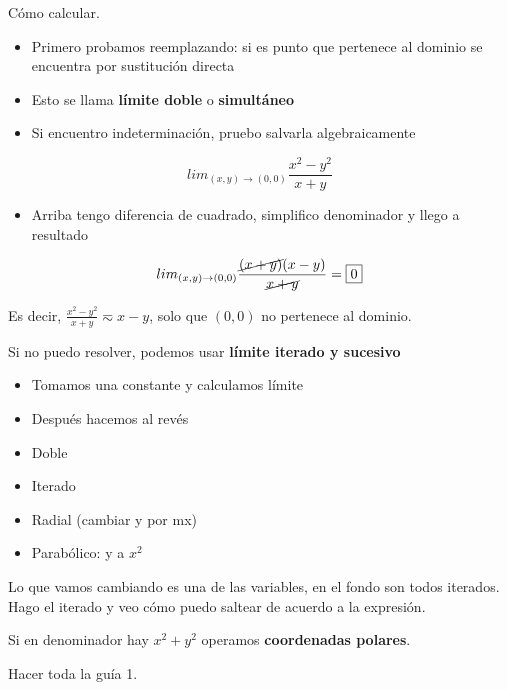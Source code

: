 Cómo calcular.
\begin{itemize}
    \item Primero probamos reemplazando: si es punto que pertenece al dominio
          se encuentra por sustitución directa
    \item Esto se llama \textbf{límite doble} o \textbf{simultáneo}
    \item Si encuentro indeterminación, pruebo salvarla algebraicamente
\end{itemize}

\begin{equation*}
    lim_{(x,y) \to (0,0)} \frac{x^{2} - y^{2}}{x + y}
\end{equation*}

\begin{itemize}
    \item Arriba tengo diferencia de cuadrado, simplifico denominador y
          llego a resultado
\end{itemize}

\begin{equation*}
    lim_{(x,y) \to (0,0)} \frac{\cancel{(x + y)}(x - y)}{\cancel{x + y}} = \boxed{0}
\end{equation*}

Es decir, \(\frac{x^{2} - y^{2}}{x + y} \eqsim x - y\), solo que \((0,0)\)
no pertenece al dominio.

Si no puedo resolver, podemos usar \textbf{límite iterado y sucesivo}
\begin{itemize}
    \item Tomamos una constante y calculamos límite
    \item Después hacemos al revés
\end{itemize}

\begin{itemize}
    \item Doble
    \item Iterado
    \item Radial (cambiar y por mx)
    \item Parabólico: y a \(x^{2}\)
\end{itemize}

Lo que vamos cambiando es una de las variables, en el fondo son todos iterados.
Hago el iterado y veo cómo puedo saltear de acuerdo a la expresión.

Si en denominador hay \(x^{2} + y^{2}\) operamos \textbf{coordenadas polares}.

Hacer toda la guía 1.